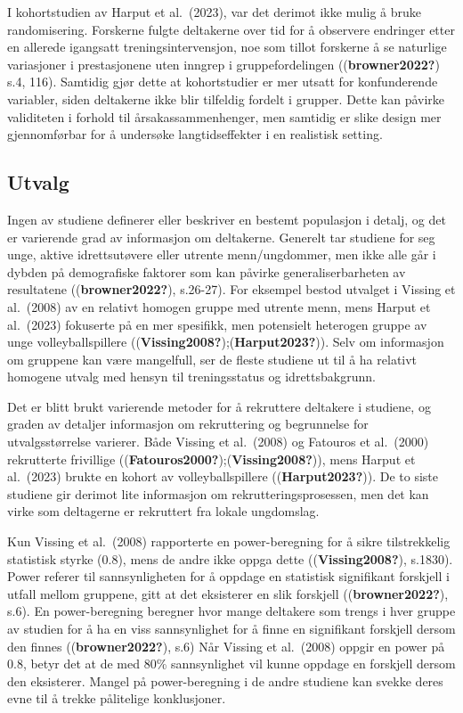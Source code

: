 \documentclass[
  letterpaper,
  DIV=11,
  numbers=noendperiod]{scrreprt}
\begin{document}
I kohortstudien av Harput et al.~(2023), var det derimot ikke mulig å
bruke randomisering. Forskerne fulgte deltakerne over tid for å
observere endringer etter en allerede igangsatt treningsintervensjon,
noe som tillot forskerne å se naturlige variasjoner i prestasjonene uten
inngrep i gruppefordelingen ((\textbf{browner2022?}) s.4, 116). Samtidig
gjør dette at kohortstudier er mer utsatt for konfunderende variabler,
siden deltakerne ikke blir tilfeldig fordelt i grupper. Dette kan
påvirke validiteten i forhold til årsakassammenhenger, men samtidig er
slike design mer gjennomførbar for å undersøke langtidseffekter i en
realistisk setting.

\subsection{Utvalg}\label{utvalg}

Ingen av studiene definerer eller beskriver en bestemt populasjon i
detalj, og det er varierende grad av informasjon om deltakerne. Generelt
tar studiene for seg unge, aktive idrettsutøvere eller utrente
menn/ungdommer, men ikke alle går i dybden på demografiske faktorer som
kan påvirke generaliserbarheten av resultatene ((\textbf{browner2022?}),
s.26-27). For eksempel bestod utvalget i Vissing et al.~(2008) av en
relativt homogen gruppe med utrente menn, mens Harput et al.~(2023)
fokuserte på en mer spesifikk, men potensielt heterogen gruppe av unge
volleyballspillere ((\textbf{Vissing2008?});(\textbf{Harput2023?})).
Selv om informasjon om gruppene kan være mangelfull, ser de fleste
studiene ut til å ha relativt homogene utvalg med hensyn til
treningsstatus og idrettsbakgrunn.

Det er blitt brukt varierende metoder for å rekruttere deltakere i
studiene, og graden av detaljer informasjon om rekruttering og
begrunnelse for utvalgsstørrelse varierer. Både Vissing et al.~(2008) og
Fatouros et al.~(2000) rekrutterte frivillige
((\textbf{Fatouros2000?});(\textbf{Vissing2008?})), mens Harput et
al.~(2023) brukte en kohort av volleyballspillere
((\textbf{Harput2023?})). De to siste studiene gir derimot lite
informasjon om rekrutteringsprosessen, men det kan virke som deltagerne
er rekruttert fra lokale ungdomslag.

Kun Vissing et al.~(2008) rapporterte en power-beregning for å sikre
tilstrekkelig statistisk styrke (0.8), mens de andre ikke oppga dette
((\textbf{Vissing2008?}), s.1830). Power referer til sannsynligheten for
å oppdage en statistisk signifikant forskjell i utfall mellom gruppene,
gitt at det eksisterer en slik forskjell ((\textbf{browner2022?}), s.6).
En power-beregning beregner hvor mange deltakere som trengs i hver
gruppe av studien for å ha en viss sannsynlighet for å finne en
signifikant forskjell dersom den finnes ((\textbf{browner2022?}), s.6)
Når Vissing et al.~(2008) oppgir en power på 0.8, betyr det at de med
80\% sannsynlighet vil kunne oppdage en forskjell dersom den eksisterer.
Mangel på power-beregning i de andre studiene kan svekke deres evne til
å trekke pålitelige konklusjoner.
\end{document}
